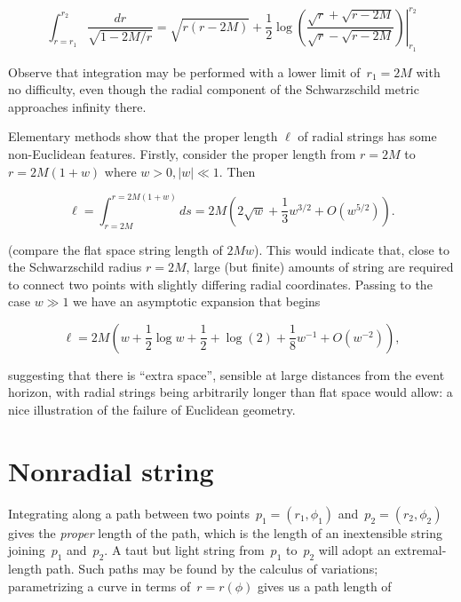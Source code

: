 \documentclass[review]{elsarticle}
\begin{document}
\begin{equation}\label{radial_string_length}
  \int_{r=r_1}^{r_2}\frac{dr}{\sqrt{1-2M/r}}=
  \left.
  \sqrt{r(r-2M)} +\frac{1}{2}\log\left(
  \frac{\sqrt{r}+\sqrt{r-2M}}{\sqrt{r}-\sqrt{r-2M}}\right)
  \right|_{r_1}^{r_2}
  \end{equation}

Observe that integration may be performed with a lower limit
of~$r_1=2M$ with no difficulty, even though the radial component of the
Schwarzschild metric approaches infinity there.

Elementary methods show that the proper length $\ell$ of radial
strings has some non-Euclidean features.  Firstly, consider the proper
length from $r=2M$ to $r=2M(1+w)$ where $w>0, \left|w\right|\ll 1$.
Then


 \begin{equation}\label{ell}
   \ell =
   \int_{r=2M}^{r=2M(1+w)}ds
   =2M\left(2\sqrt{w} + \frac{1}{3}w^{3/2} + O(w^{5/2})\right).
 \end{equation}

(compare the flat space string length of $2Mw$).  This would indicate
 that, close to the Schwarzschild radius $r=2M$, large (but finite)
 amounts of string are required to connect two points with slightly
 differing radial coordinates.  Passing to the case $w\gg 1$ we have
 an asymptotic expansion that begins

% 
\begin{equation}\label{asymptotic_ell}
  \ell = 2M\left(w +  \frac{1}{2}\log w + \frac{1}{2} + \log(2)  +  \frac{1}{8}w^{-1} + O(w^{-2})\right),
\end{equation}

\noindent suggesting that there is ``extra space'', sensible at large
distances from the event horizon, with radial strings being
arbitrarily longer than flat space would allow: a nice illustration of
the failure of Euclidean geometry.

\section{Nonradial string}
Integrating along a path between two
points~$p_1=\left(r_1,\phi_1\right)$ and~$p_2=\left(r_2,\phi_2\right)$
gives the {\em proper} length of the path, which is the length of an
inextensible string joining~$p_1$ and~$p_2$.  A taut but light string
from~$p_1$ to~$p_2$ will adopt an extremal-length path.  Such paths
may be found by the calculus of variations; parametrizing a curve in
terms of~$r=r\left(\phi\right)$ gives us a path length of
\end{document}
